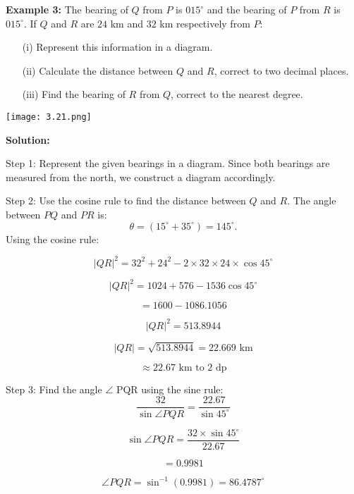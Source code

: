 \begin{flushleft}
	\textbf{Example 3:} The bearing of $Q$ from $P$ is $015^\circ$ and the bearing of $P$ from $R$ is $015^\circ$. If $Q$ and $R$ are $24$ km and $32$ km respectively from $P$:
	
	\begin{enumerate}
		\item[(i)] Represent this information in a diagram.
		\item[(ii)] Calculate the distance between $Q$ and $R$, correct to two decimal places.
		\item[(iii)] Find the bearing of $R$ from $Q$, correct to the nearest degree.
	\end{enumerate}
	
	\vspace{0.5cm}
	\begin{center}
		\texttt{[image: 3.21.png]}
	\end{center}
	
	\textbf{Solution:}
	\vspace{0.5cm}
	
	Step 1: Represent the given bearings in a diagram. Since both bearings are measured from the north, we construct a diagram accordingly.
	
	Step 2: Use the cosine rule to find the distance between $Q$ and $R$. The angle between $PQ$ and $PR$ is:
	\[
	\theta = (15^\circ + 35^\circ) = 145^\circ.
	\]
	Using the cosine rule:
	
	\[
	|QR|^2 = 32^2 + 24^2 - 2 \times 32 \times 24 \times \cos 45^\circ
	\]
	
	\[
	|QR|^2 = 1024 + 576 - 1536 \cos 45^\circ
	\]
	
	\[
	= 1600 - 1086.1056
	\]
	
	\[
	|QR|^2 = 513.8944
	\]
	
	\[
	|QR| = \sqrt{513.8944} = 22.669 \text{ km}
	\]
	
	\[
	\approx 22.67 \text{ km to 2 dp} 
	\]
	
	
	
	Step 3: Find the angle $\angle$ PQR using the sine rule:
	\[
	\frac{32}{\sin \angle PQR} = \frac{22.67}{\sin 45^\circ}
	\]
	
	\[
	\sin \angle PQR = \frac{32 \times \sin 45^\circ}{22.67}
	\]
	
	\[
	= 0.9981
	\]
	
	\[
	\angle PQR = \sin^{-1} (0.9981) = 86.4787^\circ
	\]
	
	
	

\end{flushleft}
